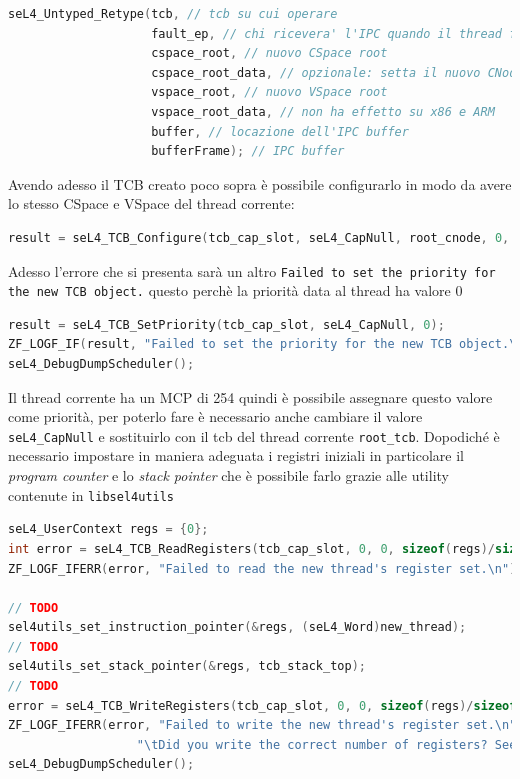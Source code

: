 \begin{lstlisting}[language=C++]
seL4_Untyped_Retype(tcb, // tcb su cui operare
					fault_ep, // chi ricevera' l'IPC quando il thread fallisce
					cspace_root, // nuovo CSpace root
					cspace_root_data, // opzionale: setta il nuovo CNode
					vspace_root, // nuovo VSpace root
					vspace_root_data, // non ha effetto su x86 e ARM
					buffer, // locazione dell'IPC buffer
					bufferFrame); // IPC buffer
\end{lstlisting} 


Avendo adesso il TCB creato poco sopra è possibile configurarlo in modo da avere lo stesso CSpace e VSpace del thread corrente:
\begin{lstlisting}[language=C++]
result = seL4_TCB_Configure(tcb_cap_slot, seL4_CapNull, root_cnode, 0, root_vspace, 0, (seL4_Word) thread_ipc_buff_sym, tcb_ipc_frame);
\end{lstlisting}
Adesso l'errore che si presenta sarà un altro \texttt{Failed to set the priority for the new TCB object.} questo perchè la priorità data al thread ha valore 0
\begin{lstlisting}[language=C++]
result = seL4_TCB_SetPriority(tcb_cap_slot, seL4_CapNull, 0);
ZF_LOGF_IF(result, "Failed to set the priority for the new TCB object.\n");
seL4_DebugDumpScheduler();
\end{lstlisting}
Il thread corrente ha un MCP di 254 quindi è possibile assegnare questo valore come priorità, per poterlo fare è necessario anche cambiare il valore \texttt{seL4\_CapNull} e sostituirlo con il tcb del thread corrente \texttt{root\_tcb}.
Dopodiché è necessario impostare in maniera adeguata i registri iniziali in particolare il \textit{program counter} e lo \textit{stack pointer} che è possibile farlo grazie alle utility contenute in \texttt{libsel4utils}
\begin{lstlisting}[language=C++]
seL4_UserContext regs = {0};
int error = seL4_TCB_ReadRegisters(tcb_cap_slot, 0, 0, sizeof(regs)/sizeof(seL4_Word), &regs);
ZF_LOGF_IFERR(error, "Failed to read the new thread's register set.\n");

// TODO
sel4utils_set_instruction_pointer(&regs, (seL4_Word)new_thread);
// TODO
sel4utils_set_stack_pointer(&regs, tcb_stack_top);
// TODO
error = seL4_TCB_WriteRegisters(tcb_cap_slot, 0, 0, sizeof(regs)/sizeof(seL4_Word), &regs);
ZF_LOGF_IFERR(error, "Failed to write the new thread's register set.\n"
                  "\tDid you write the correct number of registers? See arg4.\n");
seL4_DebugDumpScheduler();
\end{lstlisting}
